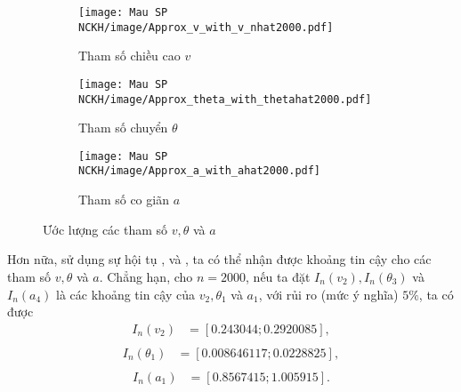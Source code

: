 \begin{figure}[ht]
  \centering
  \begin{subfigure}[b]{0.45\textwidth}
    \centering
    \texttt{[image: Mau SP NCKH/image/Approx\_v\_with\_v\_nhat2000.pdf]}
    \caption{Tham số chiều cao $v$}
    \label{fig:image3}
  \end{subfigure}
  \hfill %
  \begin{subfigure}[b]{0.45\textwidth}
    \centering
    \texttt{[image: Mau SP NCKH/image/Approx\_theta\_with\_thetahat2000.pdf]}
    \caption{Tham số chuyển $\theta$}
    \label{fig:image2}
  \end{subfigure}

  \vspace{0.1cm} %
  \begin{subfigure}[b]{\textwidth}
    \centering
    \texttt{[image: Mau SP NCKH/image/Approx\_a\_with\_ahat2000.pdf]}
    \caption{Tham số co giãn $a$}
    \label{fig:image1}
  \end{subfigure}
  
  \caption{Ước lượng các tham số $v, \theta$ và $a$}
  \label{fig:images-side-by-side}
\end{figure}

\newpage
Hơn nữa, sử dụng sự hội tụ ,  và , ta có thể nhận được khoảng tin cậy cho các tham số $v, \theta$ và $a$. 
Chẳng hạn, cho $n=2000$, nếu ta đặt $I_{n}\left(v_{2}\right), I_{n}\left(\theta_{3}\right)$ và $I_{n}\left(a_{4}\right)$ là các khoảng tin cậy của $v_{2}, \theta_{1}$ và $a_{1}$, với rủi ro (mức ý nghĩa) $5 \%$, ta có được
$$
\begin{aligned}
I_{n}\left(v_{2}\right) & =[0.243044 ; 0.2920085], \\
\end{aligned}
$$
$$
\begin{aligned}
I_{n}\left(\theta_{1}\right) & =[0.008646117 ; 0.0228825], \\
\end{aligned}
$$
$$
\begin{aligned}
I_{n}\left(a_{1}\right) & =[0.8567415 ;1.005915].
\end{aligned}
$$

